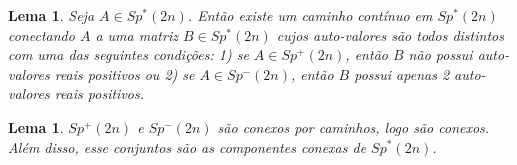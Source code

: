 \documentclass[12pt]{book}
\newtheorem{lema}[teorema]{Lema}
\newcommand{\gruposimpleticonaodegenerado}[1]{Sp^{#1}(2n)}
\begin{document}
	\begin{lema}\label{lema_conectividade_grupo_simlpetico_nao_degenerado}
		Seja $A\in \gruposimpleticonaodegenerado{*}$. Então existe um caminho contínuo em $\gruposimpleticonaodegenerado{*}$ conectando $A$ a uma matriz $B \in \gruposimpleticonaodegenerado{*}$ cujos  auto-valores são todos distintos com uma das seguintes condições: 1) se $A\in \gruposimpleticonaodegenerado{+}$, então $B$ não possui auto-valores reais positivos ou 2) se $A\in \gruposimpleticonaodegenerado{-}$, então $B$ possui apenas 2 auto-valores reais positivos.
	\end{lema}
	
	\begin{lema}\label{lema_desconexidade_grupo_simpletico_nao_degenerado}
		$ \gruposimpleticonaodegenerado{+}$ e $\gruposimpleticonaodegenerado{-}$ são conexos por caminhos, logo são conexos. Além disso, esse conjuntos são as componentes conexas de $\gruposimpleticonaodegenerado{*} $.
	\end{lema}
\end{document}
